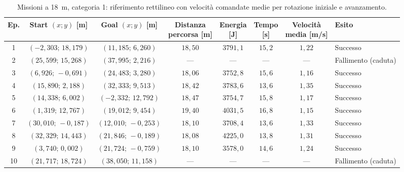 \begin{table}[H]
\centering
\caption{Missioni a 18~m, categoria 1: riferimento rettilineo con velocità comandate medie per rotazione iniziale e avanzamento.}
\label{tab:big-map-18m-baseline-cat1}
\begingroup
\fontsize{9}{11}\selectfont
\setlength{\tabcolsep}{2.5pt}
\renewcommand{\arraystretch}{1.2}
\begin{tabular}{@{}c cc cccc l@{}}
\toprule
Ep. & \shortstack{Start $(x;y)$\\{}[m]} & \shortstack{Goal $(x;y)$\\{}[m]} & \shortstack{Distanza\\percorsa [m]} & \shortstack{Energia\\{}[J]} & \shortstack{Tempo\\{}[s]} & \shortstack{Velocità\\media [m/s]} & Esito \\
\midrule
1 & $(-2{,}303;\,18{,}179)$ & $(11{,}185;\,6{,}260)$ & $18{,}50$ & $3791{,}1$ & $15{,}2$ & $1{,}22$ & Successo \\
2 & $(25{,}599;\,15{,}268)$ & $(37{,}995;\,2{,}216)$ & --- & --- & --- & --- & Fallimento (caduta) \\
3 & $(6{,}926;\,-0{,}691)$ & $(24{,}483;\,3{,}280)$ & $18{,}06$ & $3752{,}8$ & $15{,}6$ & $1{,}16$ & Successo \\
4 & $(15{,}890;\,2{,}188)$ & $(32{,}333;\,9{,}513)$ & $18{,}42$ & $3783{,}6$ & $13{,}6$ & $1{,}35$ & Successo \\
5 & $(14{,}338;\,6{,}002)$ & $(-2{,}332;\,12{,}792)$ & $18{,}47$ & $3754{,}7$ & $15{,}8$ & $1{,}17$ & Successo \\
6 & $(1{,}319;\,12{,}767)$ & $(19{,}012;\,9{,}454)$ & $19{,}40$ & $4031{,}5$ & $16{,}8$ & $1{,}15$ & Successo \\
7 & $(30{,}010;\,-0{,}187)$ & $(12{,}010;\,-0{,}253)$ & $18{,}10$ & $3708{,}4$ & $13{,}6$ & $1{,}33$ & Successo \\
8 & $(32{,}329;\,14{,}443)$ & $(21{,}846;\,-0{,}189)$ & $18{,}08$ & $4225{,}0$ & $13{,}8$ & $1{,}31$ & Successo \\
9 & $(3{,}740;\,0{,}002)$ & $(21{,}724;\,-0{,}759)$ & $18{,}10$ & $3578{,}0$ & $14{,}6$ & $1{,}24$ & Successo \\
10 & $(21{,}717;\,18{,}724)$ & $(38{,}050;\,11{,}158)$ & --- & --- & --- & --- & Fallimento (caduta) \\
\bottomrule
\end{tabular}
\endgroup
\end{table}

